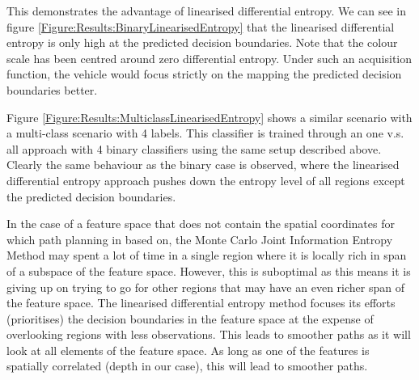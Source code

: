 \documentclass{article}
\begin{document}
%		
		
		This demonstrates the advantage of linearised differential entropy. We can see in figure \ref{Figure:Results:BinaryLinearisedEntropy} that the linearised differential entropy is only high at the predicted decision boundaries. Note that the colour scale has been centred around zero differential entropy. Under such an acquisition function, the vehicle would focus strictly on the mapping the predicted decision boundaries better.
		
		Figure \ref{Figure:Results:MulticlassLinearisedEntropy} shows a similar scenario with a multi-class scenario with 4 labels. This classifier is trained through an one v.s. all approach with 4 binary classifiers using the same setup described above. Clearly the same behaviour as the binary case is observed, where the linearised differential entropy approach pushes down the entropy level of all regions except the predicted decision boundaries.
		
		In the case of a feature space that does not contain the spatial coordinates for which path planning in based on, the Monte Carlo Joint Information Entropy Method may spent a lot of time in a single region where it is locally rich in span of a subspace of the feature space. However, this is suboptimal as this means it is giving up on trying to go for other regions that may have an even richer span of the feature space. The linearised differential entropy method focuses its efforts (prioritises) the decision boundaries in the feature space at the expense of overlooking regions with less observations. This leads to smoother paths as it will look at all elements of the feature space. As long as one of the features is spatially correlated (depth in our case), this will lead to smoother paths.
		
\end{document}
